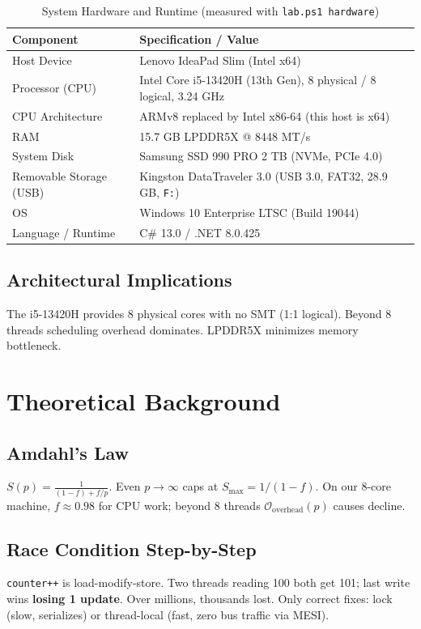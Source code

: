 \documentclass[12pt,a4paper]{article}
\begin{document}
\begin{table}[htbp]
\centering
\caption{System Hardware and Runtime (measured with \texttt{lab.ps1 hardware})}
\label{tab:hardware}
\small
\begin{tabularx}{\textwidth}{lX}
\toprule
\textbf{Component} & \textbf{Specification / Value} \\
\midrule
Host Device & Lenovo IdeaPad Slim (Intel x64) \\
Processor (CPU) & Intel Core i5-13420H (13th Gen), 8 physical / 8 logical, 3.24 GHz \\
CPU Architecture & ARMv8 replaced by Intel x86-64 (this host is x64) \\
RAM & 15.7 GB LPDDR5X @ 8448 MT/s \\
System Disk & Samsung SSD 990 PRO 2 TB (NVMe, PCIe 4.0) \\
Removable Storage (USB) & Kingston DataTraveler 3.0 (USB 3.0, FAT32, 28.9 GB, \texttt{F:}) \\
OS & Windows 10 Enterprise LTSC (Build 19044) \\
Language / Runtime & C\# 13.0 / .NET 8.0.425 \\
\bottomrule
\end{tabularx}
\end{table}

\subsection{Architectural Implications}
The i5-13420H provides 8 physical cores with no SMT (1:1 logical). Beyond 8 threads scheduling overhead dominates. LPDDR5X minimizes memory bottleneck.

\section{Theoretical Background}
\subsection{Amdahl's Law}
$S(p)=\frac{1}{(1-f)+f/p}$. Even $p\to\infty$ caps at $S_{\max}=1/(1-f)$. On our 8-core machine, $f\approx 0.98$ for CPU work; beyond 8 threads $\mathcal{O}_{\text{overhead}}(p)$ causes decline.

\subsection{Race Condition Step-by-Step}
\texttt{counter++} is load-modify-store. Two threads reading 100 both get 101; last write wins \textbf{losing 1 update}. Over millions, thousands lost. Only correct fixes: lock (slow, serializes) or thread-local (fast, zero bus traffic via MESI).
\end{document}

